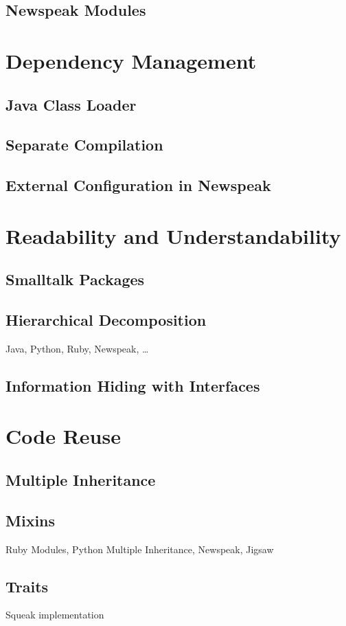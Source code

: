 \subsection{Newspeak Modules}


\section{Dependency Management}

\subsection{Java Class Loader}

\subsection{Separate Compilation}

\subsection{External Configuration in Newspeak}


\section{Readability and Understandability}

\subsection{Smalltalk Packages}

\subsection{Hierarchical Decomposition}
Java, Python, Ruby, Newspeak, \ldots

\subsection{Information Hiding with Interfaces}


\section{Code Reuse}

\subsection{Multiple Inheritance}

\subsection{Mixins}
Ruby Modules, Python Multiple Inheritance, Newspeak, Jigsaw

\subsection{Traits}
Squeak implementation
